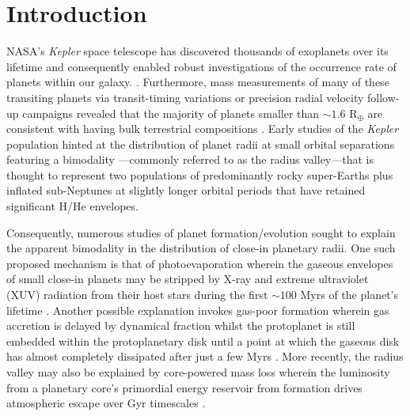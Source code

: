 \documentclass[modern]{aastex63}
\newcommand\kepler{\emph{Kepler}}
\begin{document}
\section{Introduction}
NASA's \kepler{} space telescope has discovered thousands of exoplanets over its lifetime and
consequently enabled robust investigations of the occurrence rate of planets within our galaxy.
\citep[e.g.][]{youdin11,howard12,dressing13,fressin13,petigura13b,morton14,dressing15a}.
Furthermore, mass measurements of many of these transiting planets via transit-timing variations
or precision radial velocity follow-up campaigns revealed that the majority of planets
smaller than $\sim 1.6$ R$_{\oplus}$ are consistent with having bulk terrestrial compositions
\citep[e.g.][]{weiss14,dressing15b,rogers15}.
Early studies of the \kepler{} population hinted at the distribution of planet radii at small orbital separations
featuring a bimodality \citep[e.g.][]{owen13}---commonly referred to as the radius valley---that
is thought to represent two populations of predominantly
rocky super-Earths plus inflated sub-Neptunes at slightly longer orbital periods
that have retained significant H/He envelopes.

Consequently, numerous studies of planet formation/evolution sought to explain the
apparent bimodality in the distribution of close-in planetary radii. One such proposed mechanism is
that of photoevaporation wherein the gaseous envelopes of small close-in planets may be stripped by
X-ray and extreme ultraviolet (XUV) radiation from their host stars during the first $\sim 100$ Myrs
of the planet's lifetime %
\citep{owen13,jin14,lopez14,chen16,lopez16,owen17,jin18}. Another possible explanation
invokes gas-poor formation wherein gas accretion is delayed by dynamical fraction whilst the
protoplanet is still embedded within the protoplanetary disk until a point at which the gaseous disk
has almost completely dissipated after just a few Myrs \citep{lee14,lee16}. More recently,
the radius valley may also be explained by core-powered mass loss wherein the
luminosity from a planetary core's primordial energy reservoir from formation drives atmospheric escape
over Gyr timescales \citep{ginzburg18,gupta19a,gupta19b}.
\end{document}
